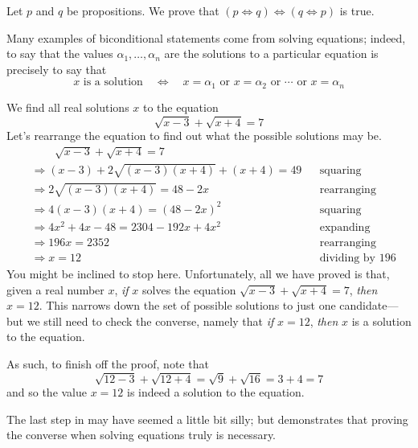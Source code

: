 \begin{exercise}
Let $p$ and $q$ be propositions. We prove that $(p \Leftrightarrow q) \Leftrightarrow (q \Leftrightarrow p)$ is true.

\end{exercise}

Many examples of biconditional statements come from solving equations; indeed, to say that the values $\alpha_1,\dots,\alpha_n$ are the solutions to a particular equation is precisely to say that
\[
x \text{ is a solution} \quad \Leftrightarrow \quad x = \alpha_1 \text{ or } x = \alpha_2 \text{ or } \cdots \text{ or } x = \alpha_n
\]

\begin{example}
\label{exSolveSqrtFirstExample}
We find all real solutions $x$ to the equation
\[
\sqrt{x-3} + \sqrt{x+4} = 7
\]
Let's rearrange the equation to find out what the possible solutions may be.
\begin{align*}
&\phantom{\Rightarrow\;\;} \sqrt{x-3} + \sqrt{x+4} = 7 && \\
&\Rightarrow (x-3) + 2\sqrt{(x-3)(x+4)} + (x+4) = 49 && \text{squaring} \\
&\Rightarrow 2\sqrt{(x-3)(x+4)} = 48-2x && \text{rearranging} \\
&\Rightarrow 4(x-3)(x+4) = (48-2x)^2 && \text{squaring} \\
&\Rightarrow 4x^2+4x-48 = 2304-192x+4x^2 && \text{expanding} \\
&\Rightarrow 196x = 2352 && \text{rearranging} \\
&\Rightarrow x=12 && \text{dividing by $196$}
\end{align*}
You might be inclined to stop here. Unfortunately, all we have proved is that, given a real number $x$, \textit{if} $x$ solves the equation $\sqrt{x-3} + \sqrt{x+4} = 7$, \textit{then} $x=12$. This narrows down the set of possible solutions to just one candidate---but we still need to check the converse, namely that \textit{if} $x=12$, \textit{then} $x$ is a solution to the equation.

As such, to finish off the proof, note that
\[
\sqrt{12-3} + \sqrt{12+4} = \sqrt{9} + \sqrt{16} = 3 + 4 = 7
\]
and so the value $x=12$ is indeed a solution to the equation.
\end{example}

The last step in  may have seemed a little bit silly; but  demonstrates that proving the converse when solving equations truly is necessary.

